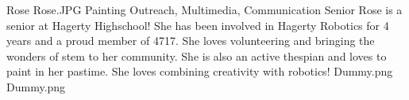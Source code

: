 \insertbio
{Rose}
{Rose.JPG}
{Painting}
{Outreach, Multimedia, Communication}
{Senior}
{
Rose is a senior at Hagerty Highschool! She has been involved in Hagerty Robotics for 4 years and a proud member of 4717. She loves volunteering and bringing the wonders of stem to her community. She is also an active thespian and loves to paint in her pastime. She loves combining creativity with robotics!
}
{Dummy.png}
{Dummy.png}